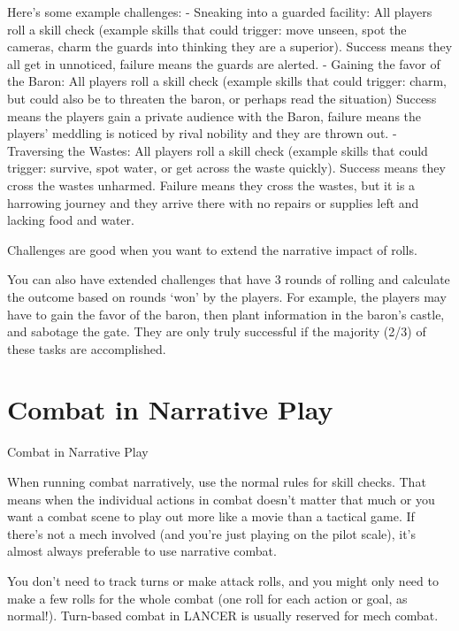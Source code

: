 Here’s some example challenges:
    -    Sneaking into a guarded facility: All players roll a skill check (example skills that could
         trigger: move unseen, spot the cameras, charm the guards into thinking they are a
         superior). Success means they all get in unnoticed, failure means the guards are alerted.
    -    Gaining the favor of the Baron: All players roll a skill check (example skills that could
         trigger: charm, but could also be to threaten the baron, or perhaps read the situation)
         Success means the players gain a private audience with the Baron, failure means the
         players’ meddling is noticed by rival nobility and they are thrown out.
    -    Traversing the Wastes: All players roll a skill check (example skills that could trigger:
         survive, spot water, or get across the waste quickly). Success means they cross the
         wastes unharmed. Failure means they cross the wastes, but it is a harrowing journey and
         they arrive there with no repairs or supplies left and lacking food and water.

Challenges are good when you want to extend the narrative impact of rolls.

You can also have extended challenges that have 3 rounds of rolling and calculate the outcome
based on rounds ‘won’ by the players. For example, the players may have to gain the favor of the
baron, then plant information in the baron’s castle, and sabotage the gate. They are only truly
successful if the majority (2/3) of these tasks are accomplished.

\section{Combat in Narrative Play}
                                      Combat in Narrative Play


When running combat narratively, use the normal rules for skill checks. That means when the
individual actions in combat doesn’t matter that much or you want a combat scene to play out
more like a movie than a tactical game. If there’s not a mech involved (and you’re just playing on
the pilot scale), it’s almost always preferable to use narrative combat.





You don’t need to track turns or make attack rolls, and you might only need to make a few rolls
for the whole combat (one roll for each action or goal, as normal!). Turn-based combat in
LANCER is usually reserved for mech combat.


